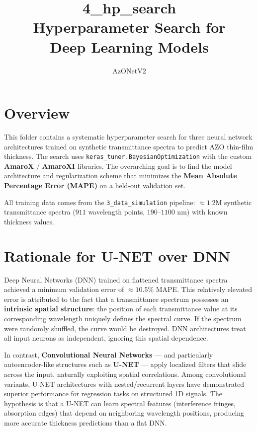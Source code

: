 \documentclass[11pt,a4paper]{article}
\title{\textbf{4\_hp\_search} \\ Hyperparameter Search for \\ Deep Learning Models}
\author{AzONetV2}
\date{}
\begin{document}
\maketitle

\section{Overview}

This folder contains a systematic hyperparameter search for three neural network architectures trained on synthetic transmittance spectra to predict AZO thin-film thickness. The search uses \texttt{keras\_tuner.BayesianOptimization} with the custom \textbf{AmaroX} / \textbf{AmaroXI} libraries. The overarching goal is to find the model architecture and regularization scheme that minimizes the \textbf{Mean Absolute Percentage Error (MAPE)} on a held-out validation set.

All training data comes from the \texttt{3\_data\_simulation} pipeline: $\approx 1.2$M synthetic transmittance spectra ($911$ wavelength points, $190$--$1100$ nm) with known thickness values.

\section{Rationale for U-NET over DNN}

Deep Neural Networks (DNN) trained on flattened transmittance spectra achieved a minimum validation error of $\approx 10.5\%$ MAPE. This relatively elevated error is attributed to the fact that a transmittance spectrum possesses an \textbf{intrinsic spatial structure}: the position of each transmittance value at its corresponding wavelength uniquely defines the spectral curve. If the spectrum were randomly shuffled, the curve would be destroyed. DNN architectures treat all input neurons as independent, ignoring this spatial dependence.

In contrast, \textbf{Convolutional Neural Networks} — and particularly autoencoder-like structures such as \textbf{U-NET} — apply localized filters that slide across the input, naturally exploiting spatial correlations. Among convolutional variants, U-NET architectures with nested/recurrent layers have demonstrated superior performance for regression tasks on structured 1D signals. The hypothesis is that a U-NET can learn spectral features (interference fringes, absorption edges) that depend on neighboring wavelength positions, producing more accurate thickness predictions than a flat DNN.
\end{document}
